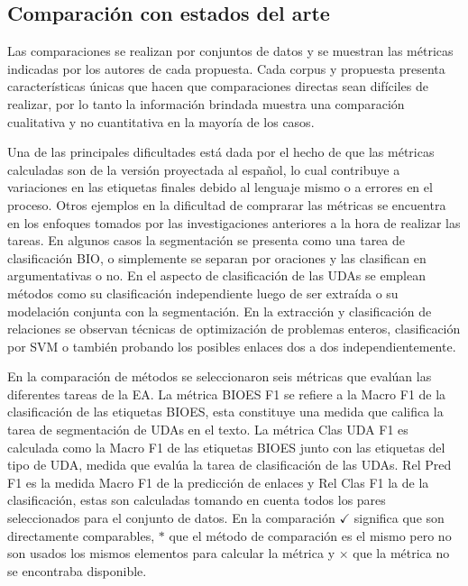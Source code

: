 \subsection{Comparación con estados del arte}

Las comparaciones se realizan por conjuntos de datos y se muestran las 
métricas indicadas por los autores de cada propuesta. Cada corpus y propuesta 
presenta características únicas que hacen que comparaciones directas sean 
difíciles de realizar, por lo tanto la información brindada muestra una comparación 
cualitativa y no cuantitativa en la mayoría de los casos. 

Una de las principales dificultades está dada por el hecho de que las métricas calculadas son de la versión proyectada
al español, lo cual contribuye a variaciones en las etiquetas finales debido al lenguaje mismo 
o a errores en el proceso. Otros ejemplos en la dificultad de comprarar las métricas se encuentra
en los enfoques tomados por las investigaciones anteriores a la hora de realizar las tareas.
En algunos casos la segmentación se presenta como una tarea de clasificación BIO, o simplemente 
se separan por oraciones y las clasifican en argumentativas o no. En el aspecto de clasificación
de las UDAs se emplean métodos como su clasificación independiente luego de ser extraída o su modelación
conjunta con la segmentación. En la extracción y clasificación de relaciones se observan técnicas de 
optimización de problemas enteros, clasificación por SVM o también probando los posibles enlaces dos 
a dos independientemente.

En la comparación de métodos se seleccionaron seis métricas que evalúan las diferentes 
tareas de la EA. La métrica BIOES F1 se refiere 
a la Macro F1 de la clasificación de las etiquetas BIOES, esta constituye una medida
que califica la tarea de segmentación de UDAs en el texto. La métrica Clas UDA F1 es 
calculada como la Macro F1 de las etiquetas BIOES junto con las etiquetas del tipo de 
UDA, medida que evalúa la tarea de clasificación de las UDAs. Rel Pred F1 es la medida 
Macro F1 de la predicción de enlaces y Rel Clas F1 la de la clasificación, estas 
son calculadas tomando en cuenta todos los pares seleccionados para el conjunto de 
datos. En la comparación $\checkmark$ significa que son directamente comparables,
$*$ que el método de comparación es el mismo pero no son usados los mismos 
elementos para calcular la métrica y $\times$ que la métrica no se encontraba disponible.

